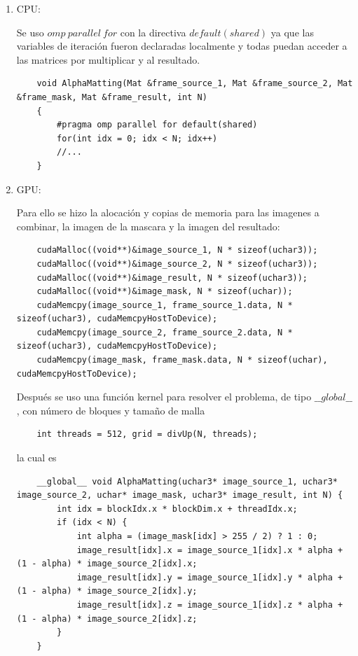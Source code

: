 \documentclass[letterpaper]{article}
\theoremstyle{definition}
\theoremstyle{lemathm}
\theoremstyle{lemathm}
\theoremstyle{lemathm}
\theoremstyle{lemademthm}
\newcommand{\1}{\mathbbm{1}}
\begin{document}
	\begin{enumerate}
		\item CPU:

		Se uso $omp\ parallel\ for$ con la directiva $default(shared)$ ya
		que las variables de iteración fueron declaradas localmente y todas puedan acceder a las matrices por multiplicar y al resultado.

		\begin{verbatim}
	void AlphaMatting(Mat &frame_source_1, Mat &frame_source_2, Mat &frame_mask, Mat &frame_result, int N)
	{
		#pragma omp parallel for default(shared)
		for(int idx = 0; idx < N; idx++)
		//...
	}
		\end{verbatim}

		\item GPU:
		
		Para ello se hizo la alocación y copias de memoria para las imagenes a combinar, la imagen de la mascara y la imagen del resultado:

		\begin{verbatim}
	cudaMalloc((void**)&image_source_1, N * sizeof(uchar3));
	cudaMalloc((void**)&image_source_2, N * sizeof(uchar3));
	cudaMalloc((void**)&image_result, N * sizeof(uchar3));
	cudaMalloc((void**)&image_mask, N * sizeof(uchar));
	cudaMemcpy(image_source_1, frame_source_1.data, N * sizeof(uchar3), cudaMemcpyHostToDevice);
	cudaMemcpy(image_source_2, frame_source_2.data, N * sizeof(uchar3), cudaMemcpyHostToDevice);
	cudaMemcpy(image_mask, frame_mask.data, N * sizeof(uchar), cudaMemcpyHostToDevice);
		\end{verbatim}

		Después se uso una función kernel para resolver el problema, de tipo $\_\_global\_\_$, con número de bloques y tamaño de malla

		\begin{verbatim}
	int threads = 512, grid = divUp(N, threads);
		\end{verbatim}
		
		la cual es

		\begin{verbatim}
	__global__ void AlphaMatting(uchar3* image_source_1, uchar3* image_source_2, uchar* image_mask, uchar3* image_result, int N) {
		int idx = blockIdx.x * blockDim.x + threadIdx.x;
		if (idx < N) {
			int alpha = (image_mask[idx] > 255 / 2) ? 1 : 0;
			image_result[idx].x = image_source_1[idx].x * alpha + (1 - alpha) * image_source_2[idx].x;
			image_result[idx].y = image_source_1[idx].y * alpha + (1 - alpha) * image_source_2[idx].y;
			image_result[idx].z = image_source_1[idx].z * alpha + (1 - alpha) * image_source_2[idx].z;
		}
	}
		\end{verbatim}
	\end{enumerate}
\end{document}

